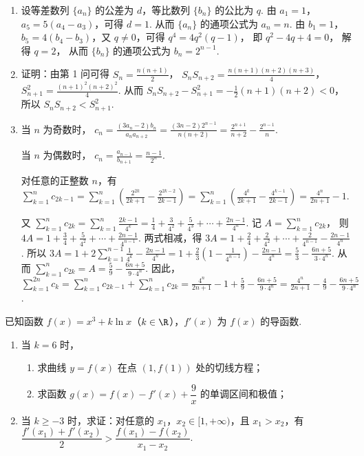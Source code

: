 \begin{solution}
\begin{enumerate}
\item 设等差数列 \( \{a_n\} \) 的公差为 \( d \)，等比数列 \( \{b_n\} \) 的公比为 \( q \).
由 \( a_1=1 \)，\( a_5=5\left( a_4-a_3 \right) \)，可得 \( d=1 \).
从而 \( \{a_n\} \) 的通项公式为
\(a_n=n\).
由 \( b_1=1 \)，\( b_5=4\left( b_4-b_3 \right) \)，又 \( q\neq0 \)，可得
\(q^4=4q^2\left( q-1 \right)\)，
即
\(q^2-4q+4=0\)，
解得 \( q=2 \)，
从而 \( \{b_n\} \) 的通项公式为
\(b_n=2^{n-1}\).

\item 证明：由第 1 问可得
\(S_n=\frac{n(n+1)}{2}\)，
\(S_nS_{n+2}=\frac{n(n+1)(n+2)(n+3)}{4}\)，\(S_{n+1}^2=\frac{(n+1)^2(n+2)^2}{4}\).
从而
\(S_nS_{n+2}-S_{n+1}^2 =-\frac12(n+1)(n+2)<0\)，
所以
\(S_nS_{n+2}<S_{n+1}^2\).

\item 当 \( n \) 为奇数时，
\(c_n=\frac{(3a_n-2)b_n}{a_na_{n+2}}
=\frac{(3n-2)2^{n-1}}{n(n+2)}
=\frac{2^{n+1}}{n+2}-\frac{2^{n-1}}{n}\).

当 \( n \) 为偶数时，
\(c_n=\frac{a_{n-1}}{b_{n+1}} =\frac{n-1}{2^n}\).

对任意的正整数 \( n \)，有
\(\sum_{k=1}^n c_{2k-1}
=\sum_{k=1}^n\left( \frac{2^{2k}}{2k+1}-\frac{2^{2k-2}}{2k-1} \right)
=\sum_{k=1}^n\left( \frac{4^k}{2k+1}-\frac{4^{k-1}}{2k-1} \right)
=\frac{4^n}{2n+1}-1\).

又
\(\sum_{k=1}^n c_{2k}
=\sum_{k=1}^n\frac{2k-1}{4^k}
=\frac14+\frac3{4^2}+\frac5{4^3}+\cdots+\frac{2n-1}{4^n}\).
记
\(A=\sum_{k=1}^n c_{2k}\)，
则
\(4A=1+\frac34+\frac5{4^2}+\cdots+\frac{2n-1}{4^{n-1}}\).
两式相减，得
\(3A=1+\frac2{4}+\frac2{4^2}+\cdots+\frac2{4^{n-1}}-\frac{2n-1}{4^n}\).
所以
\(3A=1+2\sum_{k=1}^{n-1}\frac1{4^k}-\frac{2n-1}{4^n}
=1+\frac23\left( 1-\frac1{4^{n-1}} \right)-\frac{2n-1}{4^n}
=\frac53-\frac{6n+5}{3\cdot4^n}\).
从而
\(\sum_{k=1}^n c_{2k} =A =\frac59-\frac{6n+5}{9\cdot4^n}\).
因此，
\(\sum_{k=1}^{2n}c_k
=\sum_{k=1}^n c_{2k-1}+\sum_{k=1}^n c_{2k}
=\frac{4^n}{2n+1}-1+\frac59-\frac{6n+5}{9\cdot4^n}
=\frac{4^n}{2n+1}-\frac49-\frac{6n+5}{9\cdot4^n}\).
\end{enumerate}
\end{solution}

\begin{problem}
已知函数 \(f(x)=x^3+k\ln x\)（\(k\in\R\)），\(f'(x)\) 为 \(f(x)\) 的导函数.

\begin{enumerate}
\item 当 \(k=6\) 时，
\begin{enumerate}
\item 求曲线 \(y=f(x)\) 在点 \((1,f(1))\) 处的切线方程；
\item 求函数 \(g(x)=f(x)-f'(x)+\dfrac9x\) 的单调区间和极值；
\end{enumerate}
\item 当 \(k\ge-3\) 时，求证：对任意的 \(x_1\)，\(x_2\in[1,+\infty)\)，且 \(x_1>x_2\)，有 \(\dfrac{f'(x_1)+f'(x_2)}{2}>\dfrac{f(x_1)-f(x_2)}{x_1-x_2}\).
\end{enumerate}
\end{problem}

